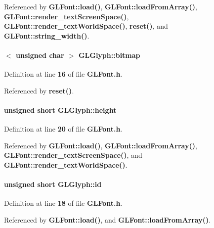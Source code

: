 Referenced by {\bf G\+L\+Font\+::load()}, {\bf G\+L\+Font\+::load\+From\+Array()}, {\bf G\+L\+Font\+::render\+\_\+text\+Screen\+Space()}, {\bf G\+L\+Font\+::render\+\_\+text\+World\+Space()}, {\bf reset()}, and {\bf G\+L\+Font\+::string\+\_\+width()}.

\paragraph[{bitmap}]{$<$ unsigned char $>$ G\+L\+Glyph\+::bitmap}\label{structGLGlyph_ab07d4c5d7b8153725c6ab802b2dbf06e}


Definition at line {\bf 16} of file {\bf G\+L\+Font.\+h}.



Referenced by {\bf reset()}.

\paragraph[{height}]{\setlength{\rightskip}{0pt plus 5cm}unsigned short G\+L\+Glyph\+::height}\label{structGLGlyph_a634bd86f0d996c64775fc95ecbe58915}


Definition at line {\bf 20} of file {\bf G\+L\+Font.\+h}.



Referenced by {\bf G\+L\+Font\+::load()}, {\bf G\+L\+Font\+::load\+From\+Array()}, {\bf G\+L\+Font\+::render\+\_\+text\+Screen\+Space()}, and {\bf G\+L\+Font\+::render\+\_\+text\+World\+Space()}.

\paragraph[{id}]{\setlength{\rightskip}{0pt plus 5cm}unsigned short G\+L\+Glyph\+::id}\label{structGLGlyph_af4328f5db2e98ba6fa3fbe93172d1cce}


Definition at line {\bf 18} of file {\bf G\+L\+Font.\+h}.



Referenced by {\bf G\+L\+Font\+::load()}, and {\bf G\+L\+Font\+::load\+From\+Array()}.

